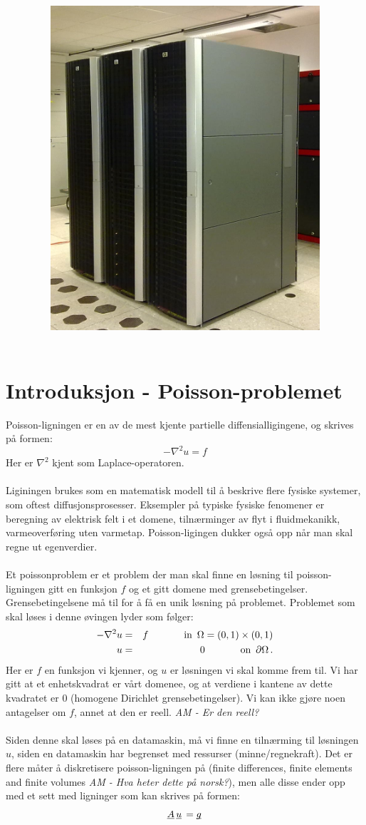 \documentclass{article}
\title{
\vspace*{\stretch{1}}
\noindent\HRule
\begin{center}
 \Huge
 \noindent	\exerciseClass \\
 \noindent \exerciseTitle \\ [4mm]
 \large
 \noindent\emph{\exerciseGroupMembers}
\noindent\HRule \newline
\end{center}
\vspace{0cm}
\begin{center}
	\includegraphics[width=10cm]{img/kongull.jpg}
\end{center}
\vspace*{\stretch{3}}
\begin{center}
\end{center}
}
\newcommand{\ub}[1]{\underbar{$#1$}\,}
\begin{document}
\pagestyle{empty}
\maketitle

\thispagestyle{empty}

\newpage \tableofcontents


\newpage


\section{Introduksjon - Poisson-problemet}
Poisson-ligningen er en av de mest kjente partielle diffensialligingene, og skrives på formen:
\begin{equation}
	-\nabla^2 u = f
\end{equation}
Her er $\nabla^2$ kjent som Laplace-operatoren.\\
\\
Liginingen brukes som en matematisk modell til å beskrive flere fysiske systemer, som oftest diffusjonsprosesser. Eksempler på typiske fysiske fenomener er beregning av elektrisk felt i et domene, tilnærminger av flyt i fluidmekanikk, varmeoverføring uten varmetap. Poisson-ligingen dukker også opp når man skal regne ut egenverdier.\\
\\
Et poissonproblem er et problem der man skal finne en løsning til poisson-ligningen gitt en funksjon $f$ og et gitt domene med grensebetingelser. Grensebetingelsene må til for å få en unik løsning på problemet. Problemet som skal løses i denne øvingen lyder som følger:
\begin{eqnarray}
	-\nabla^2 u & = & f \hspace{.5in} \textrm{in} \,\,\, \Omega = (0,1)\times (0,1) \\
	u & = & 0 \hspace{.5in} \textrm{on} \,\,\, \partial\Omega\, .
\end{eqnarray}
Her er $f$ en funksjon vi kjenner,  og $u$ er løsningen vi skal komme frem til. Vi har gitt at et enhetskvadrat  er vårt domenee, og at verdiene i kantene av dette kvadratet er $0$ (homogene Dirichlet grensebetingelser). Vi kan ikke gjøre noen antagelser om $f$, annet at den er reell.
\emph{AM - Er den reell?}\\
\\
Siden denne skal løses på en datamaskin, må vi finne en tilnærming til løsningen $u$, siden en datamaskin har begrenset med ressurser (minne/regnekraft). Det er flere måter å diskretisere poisson-ligningen på (finite differences, finite elements and finite volumes \emph{AM - Hva heter dette på norsk?}), men alle disse ender opp med et sett med ligninger som kan skrives på formen:
\begin{equation}
  \ub{A} \ub{u} = \ub{g}
\end{equation}
\end{document}
